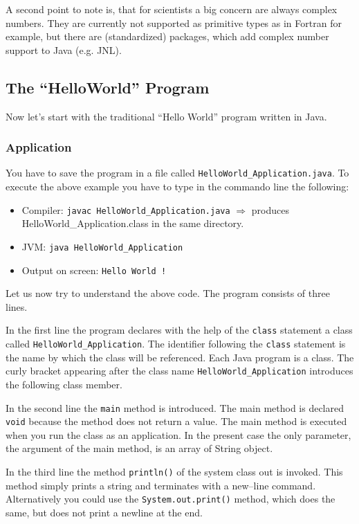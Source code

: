 A second point to note is, that for scientists a big concern are always
complex numbers. They are currently not supported as primitive types as 
in Fortran for example, but there are (standardized) packages, which
add complex number support to Java (e.g. JNL). 


\subsection{The ``HelloWorld'' Program}
\label{sec:HelloWorld}
Now let's start with the traditional ``Hello World'' program written
in Java.

\subsubsection{Application}

You have to save the program in a file called 
\verb|HelloWorld_Application.java|.
To execute the above example you have to type in the commando line the
following:
\begin{itemize}
\item Compiler: \verb/javac HelloWorld_Application.java/  
  $\Longrightarrow$ produces HelloWorld\_Application.class 
  in the same directory.
\item JVM:  \verb/java HelloWorld_Application/
\item Output on screen: \verb<Hello World !<
\end{itemize}
Let us now try to understand the above code. The program consists of
three lines. 

In the first line the program declares 
with the help of the \texttt{class} statement a class called 
\verb|HelloWorld_Application|. 
The identifier following the \texttt{class} statement is
the name by which the class will be referenced. Each Java program
is a class. The curly bracket appearing after the class name
\verb|HelloWorld_Application| introduces the following class member. 


In the second line the \verb|main| method is introduced. The main
method is declared \verb|void| because the method does not return a
value. The main method is executed when you run the class as an
application. In the present case the only parameter, the argument
of the main method, is an array of String object.

In the third line the method \verb|println()| of the system class out
is invoked. This method simply prints a string and terminates with a 
new--line command. Alternatively you could use the 
\verb|System.out.print()| method, which does the same, but does
not print a newline at the end. 

